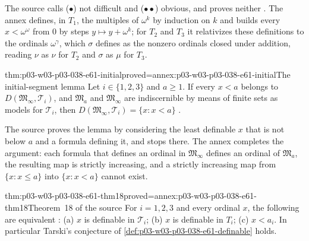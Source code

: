 The source calls (\(\bullet\)) not difficult and (\(\bullet\bullet\))
obvious, and proves neither \cite[p.~140]{Ehrenfeucht1961}. The annex
defines, in \(T_1\), the multiples of \(\omega^k\) by induction on \(k\)
and builds every \(x<\omega^\omega\) from \(0\) by steps
\(y\mapsto y+\omega^k\); for \(T_2\) and \(T_3\) it relativizes these
definitions to the ordinals \(\omega^\gamma\), which \(\sigma\) defines as
the nonzero ordinals closed under addition, reading \(\nu\) as \(\nu\) for
\(T_2\) and \(\sigma\) as \(\mu\) for \(T_3\).

\begin{hblemma}{thm:p03-w03-p03-038-e61-initial}{proved=annex:p03-w03-p03-038-e61-initial}{The initial-segment lemma}
Let \(i\in\{1,2,3\}\) and \(a\ge1\). If every \(x<a\) belongs to
\(D(\mathfrak M_\infty,\mathcal T_i)\), and \(\mathfrak M_a\) and
\(\mathfrak M_\infty\) are indiscernible by means of finite sets as
models for \(\mathcal T_i\), then
\(D(\mathfrak M_\infty,\mathcal T_i)=\{x:x<a\}\)
\cite[p.~140]{Ehrenfeucht1961}.
\end{hblemma}

The source proves the lemma by considering the least definable \(x\) that
is not below \(a\) and a formula defining it, and stops there. The annex
completes the argument: each formula that defines an ordinal in
\(\mathfrak M_\infty\) defines an ordinal of \(\mathfrak M_a\), the
resulting map is strictly increasing, and a strictly increasing map from
\(\{x:x\le a\}\) into \(\{x:x<a\}\) cannot exist.

\begin{hbtheorem}{thm:p03-w03-p03-038-e61-thm18}{proved=annex:p03-w03-p03-038-e61-thm18}{Theorem~18 of the source}
For \(i=1,2,3\) and every ordinal \(x\), the following are equivalent
\cite[p.~141]{Ehrenfeucht1961}: (a) \(x\) is definable in
\(\mathcal T_i\); (b) \(x\) is definable in \(T_i\); (c) \(x<a_i\). In
particular Tarski's conjecture of
\cref{def:p03-w03-p03-038-e61-definable} holds.
\end{hbtheorem}

